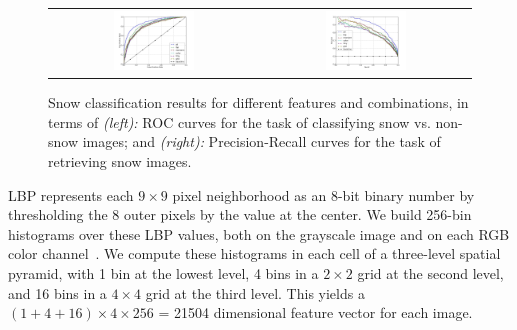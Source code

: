 \begin{figure}[th!]
\begin{center}
\vspace{-16pt}
\begin{tabular}{cc}
 \includegraphics[width=0.4\textwidth]{figs/ROC-curves.jpg} &
\includegraphics[width=0.4\textwidth]{figs/PR-curves.jpg} \\
\end{tabular}
\end{center}
\vspace{-8pt}
\caption{
Snow classification results for different features and combinations, in terms of {\textit{(left):}} ROC curves for the task of classifying snow vs. non-snow images; and 
{\textit{(right):}} Precision-Recall curves for the task of retrieving snow images.
}
\label{fig:PR_ROC_snow}
\end{figure}


 LBP represents each $9 \times 9$ pixel neighborhood 
as an 8-bit binary number by thresholding the 8 outer pixels
by the value at the center.  We build 256-bin histograms over
these LBP values, both on the grayscale image and on each RGB color
channel~\cite{korayem2012solving}. We compute these histograms in each cell of a three-level spatial
pyramid, with 1 bin at the lowest level, 4 bins in a $2 \times 2$ grid
at the second level, and 16 bins in a $4 \times 4$ grid at the third level.
This yields a $(1+4+16) \times 4 \times 256$ = 21504 dimensional feature
vector for each image.

